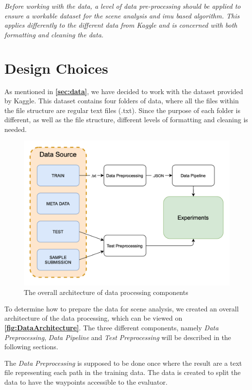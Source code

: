 \textit{Before working with the data, a level of data pre-processing should be applied to ensure a workable dataset for the scene analysis and \gls{imu} based algorithm. This applies differently to the different data from Kaggle and is concerned with both formatting and cleaning the data.}

\section{Design Choices}
As mentioned in \textbf{\autoref{sec:data}}, we have decided to work with the dataset provided by Kaggle. This dataset contains four folders of data, where all the files within the file structure are regular text files (.txt). Since the purpose of each folder is different, as well as the file structure, different levels of formatting and cleaning is needed.

\begin{figure}[H]
    \centering
    \includegraphics[scale=0.35]{Images/DataStandard/DataFlow.png}
    \caption{The overall architecture of data processing components}
    \label{fig:DataArchitecture}
\end{figure}

To determine how to prepare the data for scene analysis, we created an overall architecture of the data processing, which can be viewed on \textbf{\autoref{fig:DataArchitecture}}. The three different components, namely \textit{Data Preprocessing}, \textit{Data Pipeline} and \textit{Test Preprocessing} will be described in the following sections. 

The \textit{Data Preprocessing} is supposed to be done once where the result are a text file representing each path in the training data. The data is created to split the data to have the waypoints accessible to the evaluator.

